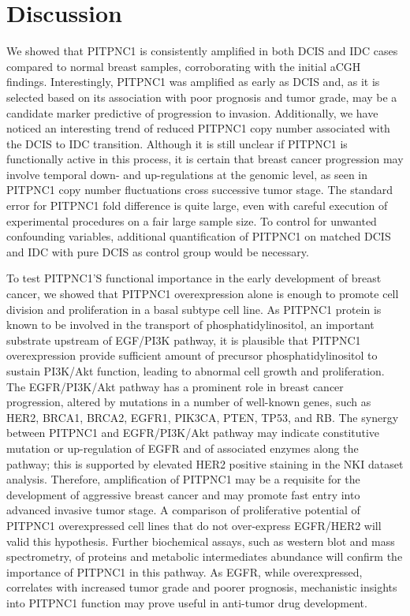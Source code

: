 \documentclass[10pt,letterpaper]{article}
\begin{document}
\newpage
\section*{Discussion}
We showed that PITPNC1 is consistently amplified in both DCIS and IDC cases compared to normal breast samples, corroborating with the initial aCGH findings. Interestingly, PITPNC1 was amplified as early as DCIS and, as it is selected based on its association with poor prognosis and tumor grade, may be a candidate marker predictive of progression to invasion. Additionally, we have noticed an interesting trend of reduced PITPNC1 copy number associated with the DCIS to IDC transition. Although it is still unclear if PITPNC1 is functionally active in this process, it is certain that breast cancer progression may involve temporal down- and up-regulations at the genomic level, as seen in PITPNC1 copy number fluctuations cross successive tumor stage. The standard error for PITPNC1 fold difference is quite large, even with careful execution of experimental procedures on a fair large sample size. To control for unwanted confounding variables, additional quantification of PITPNC1 on matched DCIS and IDC with pure DCIS as control group would be necessary.

To test PITPNC1’S functional importance in the early development of breast cancer, we showed that PITPNC1 overexpression alone is enough to promote cell division and proliferation in a basal subtype cell line. As PITPNC1 protein is known to be involved in the transport of phosphatidylinositol, an important substrate upstream of EGF/PI3K pathway, it is plausible that PITPNC1 overexpression provide sufficient amount of precursor phosphatidylinositol to sustain PI3K/Akt function, leading to abnormal cell growth and proliferation. The EGFR/PI3K/Akt pathway has a prominent role in breast cancer progression, altered by mutations in a number of well-known genes, such as HER2, BRCA1, BRCA2, EGFR1, PIK3CA, PTEN, TP53, and RB. \cite{16_davis_sokolosky_stadelman_abrams_libra_candido_nicoletti_polesel_maestro_dassoro} The synergy between PITPNC1 and EGFR/PI3K/Akt pathway may indicate constitutive mutation or up-regulation of EGFR and of associated enzymes along the pathway; this is supported by elevated HER2 positive staining in the NKI dataset analysis. Therefore, amplification of PITPNC1 may be a requisite for the development of aggressive breast cancer and may promote fast entry into advanced invasive tumor stage. A comparison of proliferative potential of PITPNC1 overexpressed cell lines that do not over-express EGFR/HER2 will valid this hypothesis. Further biochemical assays, such as western blot and mass spectrometry, of proteins and metabolic intermediates abundance will confirm the importance of PITPNC1 in this pathway. As EGFR, while overexpressed, correlates with increased tumor grade and poorer prognosis, \cite{4_richard_sainsbury_needham_farndon_malcolm_harris_1987} mechanistic insights into PITPNC1 function may prove useful in anti-tumor drug development.
\end{document}
